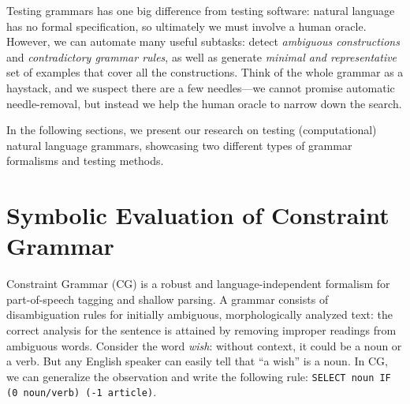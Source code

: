 


Testing grammars has one big difference from testing software: natural language has no formal specification, 
so ultimately we must involve a human oracle. However, we can automate many useful subtasks: detect \emph{ambiguous constructions} and \emph{contradictory grammar rules}, as well as generate \emph{minimal and representative} set of examples that cover all the constructions. 
Think of the whole grammar as a haystack, and we suspect there are a few needles---we cannot promise automatic needle-removal, but instead we help the human oracle to narrow down the search.

In the following sections, we present our research on testing (computational) natural language grammars, showcasing two different types of grammar formalisms and testing methods.

\section{Symbolic Evaluation of Constraint Grammar}

Constraint Grammar (CG) \cite{karlsson1995constraint} is a robust and language-independent formalism 
for part-of-speech tagging and shallow parsing. 
A grammar consists of disambiguation rules for initially ambiguous, 
morphologically analyzed text: the correct analysis for the sentence 
is attained by removing improper readings from ambiguous words.
Consider the word \emph{wish}: without context, it could be a noun or a verb.
But any English speaker can easily tell that ``a wish'' is a noun.
In CG, we can generalize the observation and write the following rule: 
\texttt{SELECT noun IF (0 noun/verb) (-1 article)}.

